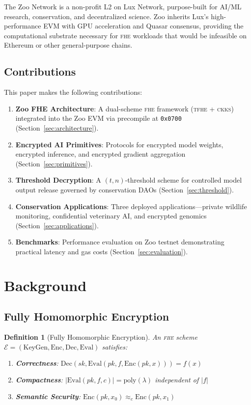 \documentclass[11pt,letterpaper]{article}
\newtheorem{definition}{Definition}[section]
\newcommand{\FHE}{\textsc{fhe}}
\newcommand{\TFHE}{\textsc{tfhe}}
\newcommand{\CKKS}{\textsc{ckks}}
\begin{document}
The Zoo Network is a non-profit L2 on Lux Network, purpose-built for AI/ML research, conservation, and decentralized science. Zoo inherits Lux's high-performance EVM with GPU acceleration and Quasar consensus, providing the computational substrate necessary for \FHE{} workloads that would be infeasible on Ethereum or other general-purpose chains.

\subsection{Contributions}

This paper makes the following contributions:

\begin{enumerate}
    \item \textbf{Zoo FHE Architecture}: A dual-scheme \FHE{} framework (\TFHE{} + \CKKS{}) integrated into the Zoo EVM via precompile at \texttt{0x0700} (Section~\ref{sec:architecture}).

    \item \textbf{Encrypted AI Primitives}: Protocols for encrypted model weights, encrypted inference, and encrypted gradient aggregation (Section~\ref{sec:primitives}).

    \item \textbf{Threshold Decryption}: A $(t, n)$-threshold scheme for controlled model output release governed by conservation DAOs (Section~\ref{sec:threshold}).

    \item \textbf{Conservation Applications}: Three deployed applications---private wildlife monitoring, confidential veterinary AI, and encrypted genomics (Section~\ref{sec:applications}).

    \item \textbf{Benchmarks}: Performance evaluation on Zoo testnet demonstrating practical latency and gas costs (Section~\ref{sec:evaluation}).
\end{enumerate}

\section{Background}

\subsection{Fully Homomorphic Encryption}

\begin{definition}[Fully Homomorphic Encryption]
An \FHE{} scheme $\mathcal{E} = (\text{KeyGen}, \text{Enc}, \text{Dec}, \text{Eval})$ satisfies:
\begin{enumerate}
    \item \textbf{Correctness}: $\text{Dec}(sk, \text{Eval}(pk, f, \text{Enc}(pk, x))) = f(x)$
    \item \textbf{Compactness}: $|\text{Eval}(pk, f, c)| = \text{poly}(\lambda)$ independent of $|f|$
    \item \textbf{Semantic Security}: $\text{Enc}(pk, x_0) \approx_c \text{Enc}(pk, x_1)$
\end{enumerate}
\end{definition}
\end{document}
